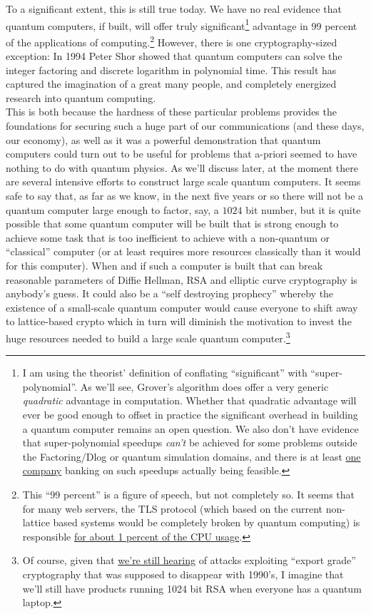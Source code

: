 To a significant extent, this is still true today. We have no real
evidence that quantum computers, if built, will offer truly
significant\footnote{I am using the theorist' definition of conflating
  ``significant'' with ``super-polynomial''. As we'll see, Grover's
  algorithm does offer a very generic \emph{quadratic} advantage in
  computation. Whether that quadratic advantage will ever be good enough
  to offset in practice the significant overhead in building a quantum
  computer remains an open question. We also don't have evidence that
  super-polynomial speedups \emph{can't} be achieved for some problems
  outside the Factoring/Dlog or quantum simulation domains, and there is
  at least \href{http://www.dwavesys.com/}{one company} banking on such
  speedups actually being feasible.} advantage in 99 percent of the
applications of computing.\footnote{This ``99 percent'' is a figure of
  speech, but not completely so. It seems that for many web servers, the
  TLS protocol (which based on the current non-lattice based systems
  would be completely broken by quantum computing) is responsible
  \href{https://goo.gl/Gekjrc}{for about 1 percent of the CPU usage}.}
However, there is one cryptography-sized exception: In 1994 Peter Shor
showed that quantum computers can solve the integer factoring and
discrete logarithm in polynomial time. This result has captured the
imagination of a great many people, and completely energized research
into quantum computing.\\
This is both because the hardness of these particular problems provides
the foundations for securing such a huge part of our communications (and
these days, our economy), as well as it was a powerful demonstration
that quantum computers could turn out to be useful for problems that
a-priori seemed to have nothing to do with quantum physics. As we'll
discuss later, at the moment there are several intensive efforts to
construct large scale quantum computers. It seems safe to say that, as
far as we know, in the next five years or so there will not be a quantum
computer large enough to factor, say, a \(1024\) bit number, but it is
quite possible that some quantum computer will be built that is strong
enough to achieve some task that is too inefficient to achieve with a
non-quantum or ``classical'' computer (or at least requires more
resources classically than it would for this computer). When and if such
a computer is built that can break reasonable parameters of Diffie
Hellman, RSA and elliptic curve cryptography is anybody's guess. It
could also be a ``self destroying prophecy'' whereby the existence of a
small-scale quantum computer would cause everyone to shift away to
lattice-based crypto which in turn will diminish the motivation to
invest the huge resources needed to build a large scale quantum
computer.\footnote{Of course, given that
  \href{http://blog.cryptographyengineering.com/2016/03/attack-of-week-drown.html}{we're
  still hearing} of attacks exploiting ``export grade'' cryptography
  that was supposed to disappear with 1990's, I imagine that we'll still
  have products running 1024 bit RSA when everyone has a quantum laptop.}


